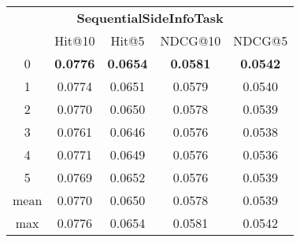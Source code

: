 \documentclass{article}
\begin{document}
 

\begin{tabular}{c|cccc}

\multicolumn{5}{c}{\textbf{SequentialSideInfoTask}} \\
\noalign{\smallskip}
\noalign{\smallskip}
\toprule
\multicolumn{1}{c}{Template ID}	&	\multicolumn{1}{|c}{Hit@10}	&	\multicolumn{1}{c}{Hit@5}	&	\multicolumn{1}{c}{NDCG@10}	&	\multicolumn{1}{c}{NDCG@5}\\
\midrule
0	&	\textbf{0.0776}	&	\textbf{0.0654}	&	\textbf{0.0581}	&	\textbf{0.0542}\\
1	&	0.0774	&	0.0651	&	0.0579	&	0.0540\\
2	&	0.0770	&	0.0650	&	0.0578	&	0.0539\\
3	&	0.0761	&	0.0646	&	0.0576	&	0.0538\\
4	&	0.0771	&	0.0649	&	0.0576	&	0.0536\\
5	&	0.0769	&	0.0652	&	0.0576	&	0.0539\\
\midrule
mean	&	0.0770	&	0.0650	&	0.0578	&	0.0539\\
max	&	0.0776	&	0.0654	&	0.0581	&	0.0542\\
\bottomrule

\end{tabular}
\end{document}

